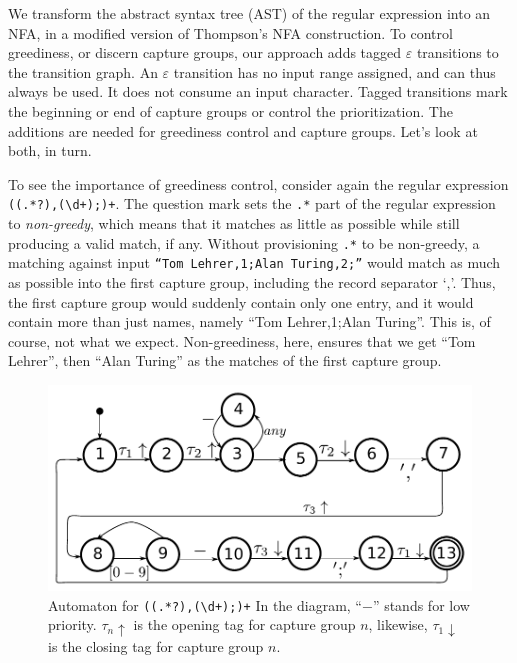 \documentclass[11pt]{Thesis}
\theoremstyle{definition}
\begin{document}
We transform the abstract syntax tree (AST) of the regular expression into an NFA,
in a modified version of Thompson's NFA construction. To
control greediness, or discern capture groups, our approach adds tagged
$\varepsilon$ transitions to the transition graph. An
$\varepsilon$ transition has no input range assigned, and can thus always
be used. It does not consume an input character. Tagged transitions 
mark the beginning or end of capture groups or control the prioritization.
The additions are needed for greediness control and capture groups.
Let's look at both, in turn.

To see the importance of greediness control, consider again the regular
expression \texttt{((.*?),(\textbackslash{}d+);)+}. The question
mark sets the \texttt{.*} part of the regular expression to
\emph{non-greedy}, which means that it matches as little as
possible while still producing a valid match, if any.  Without
provisioning \texttt{.*} to be non-greedy, a matching against input
\texttt{``Tom Lehrer,1;Alan Turing,2;''} would match as much as
possible into the first capture group, including the record separator
`,'.  Thus, the first capture group would suddenly contain only one
entry, and it would contain more than just names, namely ``Tom
Lehrer,1;Alan Turing''.  This is, of course, not what we expect.
Non-greediness, here, ensures that we get ``Tom Lehrer'', then
``Alan Turing'' as the matches of the first capture group.

\begin{figure}[htp]
\includegraphics[width=\linewidth]{graphs/lehrer_automaton}

\caption[NFA for \texttt{((.*?),(\textbackslash{}d+);)+}]{\label{fig:example-automaton}
Automaton for \texttt{((.*?),(\textbackslash{}d+);)+} 
In the diagram, ``$-$'' stands for low priority. $\tau_n\uparrow$ is the
opening tag for capture group $n$, likewise, $\tau_1\downarrow$ is the closing
tag for capture group $n$.}
\end{figure}
\end{document}
